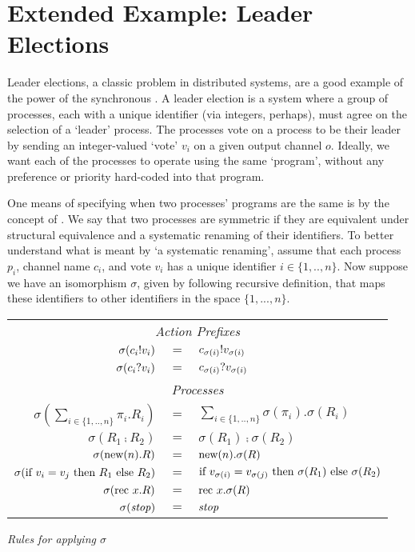 \section{Extended Example: Leader Elections}\label{secleaderelecs}
Leader elections, a classic problem in distributed systems, are a good example of the power of the synchronous \picalc.
A leader election is a system where a group of processes, each with a unique identifier (via integers, perhaps), must agree on the selection of a `leader' process.
The processes vote on a process to be their leader by sending an integer-valued `vote' $v_i$ on a given output channel $o$.  
Ideally, we want each of the processes to operate using the same `program', without any preference or priority hard-coded into that program.

One means of specifying when two processes' programs are the same is by the concept of .
We say that two processes are symmetric if they are equivalent under structural equivalence and a systematic renaming of their identifiers.
To better understand what is meant by `a systematic renaming', assume that each process $p_i$, channel name $c_i$, and vote $v_i$ has a unique identifier $i \in \{1,..,n\}$.
Now suppose we have an isomorphism $\sigma$, given by following recursive definition, that maps these identifiers to other identifiers in the space $\{1,...,n\}$.
\begin{insettable_wide}
	\begin{center}
		\begin{tabular}{r l l}
		\multicolumn{3}{c}{\emph{Action Prefixes}}\\
			$\sigma({c_i}!{v_i})$ &$= $ &$ {c_{\sigma(i)}}!{v_{\sigma(i)}}$\\
			$\sigma({c_i}?{v_i})$ &$=$ &$ {c_{\sigma(i)}}?{v_{\sigma(i)}}$\\[18pt]
		\multicolumn{3}{c}{\emph{Processes}}\\
			$\sigma(\displaystyle\sum_{i\in \{1,..,n\}} \pi_i.R_i)$ &$=$ &$ \displaystyle\sum_{i\in \{1,..,n\}} \sigma(\pi_i).\sigma(R_i)$\\
			$\sigma(R_1 \comp R_2)$ &$=$ &$ \sigma(R_1)\comp \sigma(R_2)$\\
			$\sigma(\text{new}({n}).R)$ & $=$ &$  \text{new}({n}).\sigma(R)$\\
			$\sigma(\text{if } {v_i = v_j}\text{ then } R_1 \text{ else } R_2)$ &$=$ &$ \text{if } {v_{\sigma(i)} = v_{\sigma(j)}}\text{ then } \sigma(R_1) \text{ else } \sigma(R_2)$\\
			$\sigma(\text{rec }{x}. R)$ & $=$ &$\text{rec }{x}.\sigma(R)$\\
			$\sigma(\mbox{\emph{stop}})$ & $=$ & $\mbox{\emph{stop}}$\\
		\end{tabular}
	\end{center}
	\caption{\emph{Rules for applying $\sigma$}}\label{sigmarules}
\end{insettable_wide}
